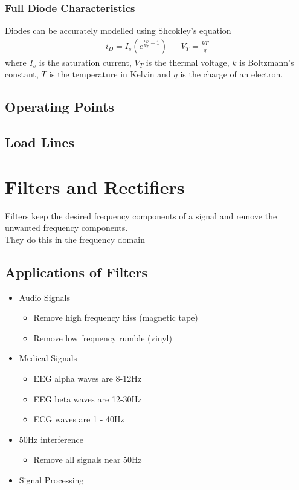 \documentclass[oneside]{book}
\begin{document}
                \subsection{Full Diode Characteristics}
                    Diodes can be accurately modelled using Shcokley's equation
                    \begin{align*}
                        i_D = I_s \left( e^{\frac{v_D}{V_T} -1} \right) && V_T = \frac{kT}{q}
                    \end{align*}
                    where $I_s$ is the saturation current, $V_T$ is the thermal voltage, $k$ is Boltzmann's constant, $T$ is the temperature in Kelvin and $q$ is the charge of an electron.
            \section{Operating Points}
            \section{Load Lines}
        \chapter{Filters and Rectifiers}
            Filters keep the desired frequency components of a signal and remove the unwanted frequency components.\\
            They do this in the frequency domain
            \section{Applications of Filters}
                \begin{itemize}
                    \item Audio Signals
                    \begin{itemize}
                        \item Remove high frequency hiss (magnetic tape)
                        \item Remove low frequency rumble (vinyl)
                    \end{itemize}
                    \item Medical Signals
                    \begin{itemize}
                        \item EEG alpha waves are 8-12Hz
                        \item EEG beta waves are 12-30Hz
                        \item ECG waves are 1 - 40Hz
                    \end{itemize}
                    \item 50Hz interference
                    \begin{itemize}
                        \item Remove all signals near 50Hz
                    \end{itemize}
                    \item Signal Processing
                \end{itemize}
\end{document}
